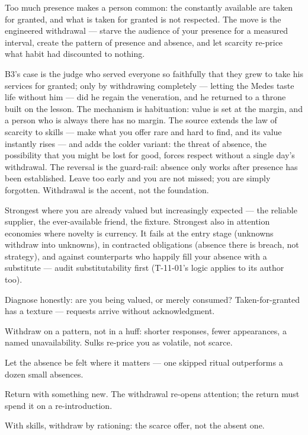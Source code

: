 \begin{core}
Too much presence makes a person common: the constantly available are taken for granted, and what is taken for granted is not respected. The move is the engineered withdrawal --- starve the audience of your presence for a measured interval, create the pattern of presence and absence, and let scarcity re-price what habit had discounted to nothing.
\end{core}
\begin{mechanism}
B3's case is the judge who served everyone so faithfully that they grew to take his services for granted; only by withdrawing completely --- letting the Medes taste life without him --- did he regain the veneration, and he returned to a throne built on the lesson. The mechanism is habituation: value is set at the margin, and a person who is always there has no margin. The source extends the law of scarcity to skills --- make what you offer rare and hard to find, and its value instantly rises --- and adds the colder variant: the threat of absence, the possibility that you might be lost for good, forces respect without a single day's withdrawal. The reversal is the guard-rail: absence only works after presence has been established. Leave too early and you are not missed; you are simply forgotten. Withdrawal is the accent, not the foundation.
\end{mechanism}
\begin{conditions}
Strongest where you are already valued but increasingly expected --- the reliable supplier, the ever-available friend, the fixture. Strongest also in attention economies where novelty is currency. It fails at the entry stage (unknowns withdraw into unknowns), in contracted obligations (absence there is breach, not strategy), and against counterparts who happily fill your absence with a substitute --- audit substitutability first (T-11-01's logic applies to its author too).
\end{conditions}
\begin{application}
  \item Diagnose honestly: are you being valued, or merely consumed? Taken-for-granted has a texture --- requests arrive without acknowledgment.
  \item Withdraw on a pattern, not in a huff: shorter responses, fewer appearances, a named unavailability. Sulks re-price you as volatile, not scarce.
  \item Let the absence be felt where it matters --- one skipped ritual outperforms a dozen small absences.
  \item Return with something new. The withdrawal re-opens attention; the return must spend it on a re-introduction.
  \item With skills, withdraw by rationing: the scarce offer, not the absent one.
\end{application}
